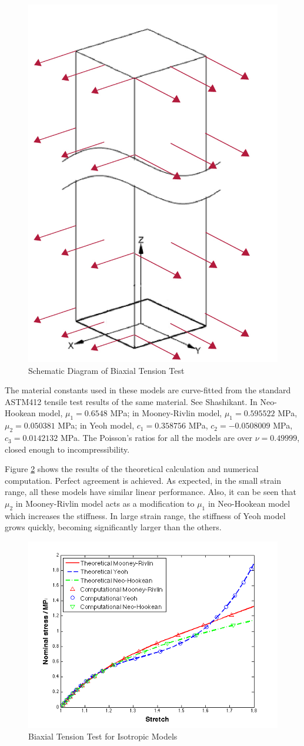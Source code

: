\begin{figure}[h!]
\centering
\includegraphics[width=.3\textwidth]{./figures/biaxial_schematic.jpg}
\caption{Schematic Diagram of Biaxial Tension Test}
\label{fig:biaxial_schematic}
\end{figure}

The material constants used in these models are curve-fitted from the standard ASTM412 tensile test results of the same material. See Shashikant. In Neo-Hookean model, $\mu_1 = 0.6548$ MPa; in Mooney-Rivlin model, $\mu_1 = 0.595522$ MPa, $\mu_2 = 0.050381$ MPa; in Yeoh model, $c_1 = 0.358756$ MPa, $c_2 = - 0.0508009$ MPa, $c_3 = 0.0142132$ MPa. The Poisson's ratios for all the models are over $\nu = 0.49999$, closed enough to incompressibility.

Figure \ref{fig:biaxial1} shows the results of the theoretical calculation and numerical computation. Perfect agreement is achieved. As expected, in the small strain range, all these models have similar linear performance. Also, it can be seen that $\mu_2$ in Mooney-Rivlin model acts as a modification to $\mu_1$ in Neo-Hookean model which increases the stiffness. In large strain range, the stiffness of Yeoh model grows quickly, becoming significantly larger than the others.

\begin{figure}[h!]
\centering
\includegraphics[width=.6\textwidth]{./figures/biaxial1.png}
\caption{Biaxial Tension Test for Isotropic Models}
\label{fig:biaxial1}
\end{figure}

